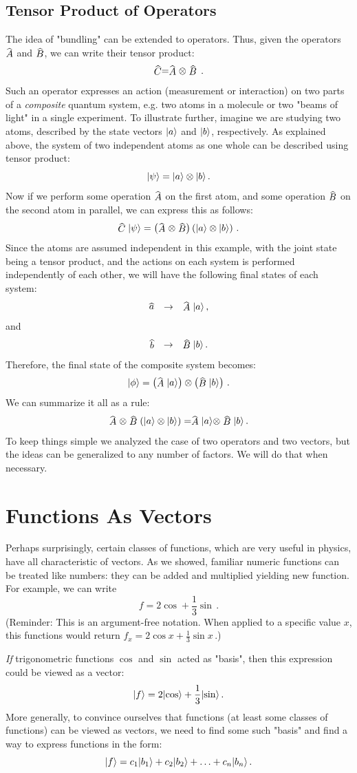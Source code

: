 \subsection{Tensor Product of Operators}
The idea of "bundling" can be extended to operators. Thus, given the operators $\op{A}$ and $\op{B}$, we can write their tensor product:
\[
\op{C}=\op{A}\otimes\op{B}\,.
\]
Such an operator expresses an action (measurement or interaction) on two parts of a \emph{composite} quantum system, e.g. two atoms in a molecule or two "beams of light" in a single experiment. To illustrate further, imagine we are studying two atoms, described by the state vectors $|{a}\rangle$  and $|{b}\rangle$, respectively. As explained above, the system of two independent atoms as one whole can be described using tensor product:
\[
|{\psi}\rangle=|{a}\rangle\otimes|{b}\rangle\,.
\]
Now if we perform some operation $\op{A}$ on the first atom, and some operation $\op{B}$ on the second atom in parallel, we can express this as follows:
\[
\op{C}\ket{\psi}=\left(\op{A}\otimes\op{B}\right)\left(\ket{a}\otimes\ket{b}\right)\,.
\] 
Since the atoms are assumed independent in this example, with the joint state being a tensor product, and the actions on each system is performed independently of each other, we will have the following final states of each system:
\[
\op{a}\quad\to\quad \op{A}\ket{a}\,,
\]
and
\[
\op{b}\quad\to\quad \op{B}\ket{b}\,.
\]
Therefore, the final state of the composite system becomes:
\[
\ket{\phi} = \left(\op{A}\ket{a}\right)\otimes\left(\op{B}\ket{b}\right)\,.
\]
We can summarize it all as a rule:
\[
\op{A}\otimes\op{B}\left(\ket{a}\otimes\ket{b}\right)= \op{A}\ket{a}\otimes\op{B}\ket{b}\,.
\]
To keep things simple we analyzed the case of two operators and two vectors, but the ideas can be generalized to any number of factors. We will do that when necessary.


\section{Functions As Vectors}
Perhaps surprisingly, certain classes of functions, which are very useful in physics, have all characteristic of vectors.  As we showed, familiar numeric functions can be treated like numbers: they can be added and multiplied yielding new function. For example, we can write
\[
f = 2\cos + \frac{1}{3}\sin\,.
\]
(Reminder: This is an argument-free notation. When applied to a specific value $x$, this functions would return $f_x = 2\cos x + \frac{1}{3}\sin x\,.$)

\emph{If} trigonometric functions $\cos$ and $\sin$ acted as "basis", then this expression could be viewed as a vector:
\[
|{f}\rangle=2|{\cos}\rangle+\frac{1}{3}|{\sin}\rangle\,.
\]
More generally, to convince ourselves that functions (at least some classes of functions) can be viewed as vectors, we need to find some such "basis" and find a way to express functions in the form:
\[
|{f}\rangle = c_1|{b_1}\rangle+c_2|{b_2}\rangle+\ldots+c_n|{b_n}\rangle\,.
\]

